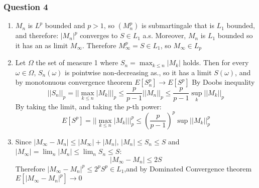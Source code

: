 \documentclass[12pt]{article}
\newcommand{\Q}[1]{\subsubsection*{Question #1}}
\begin{document}
\Q{4}
\begin{enumerate}
\item $M_n$ is $L^p$ bounded and $p > 1$, so $(M_n^p)$ is submartingale that is $L_1$ bounded, and therefore: $|M_n|^p$ converges to $S \in L_1$ a.s.
  Moreover, $M_n$ is $L_1$ bounded so it has an as limit
  $M_{\infty}$.
  Therefore $M_{\infty}^p = S \in L_1$,
  so $M_{\infty} \in L_p$

\item
  Let $\Omega$ the set of measure 1 where $S_n = \max_{k \le n} |M_k|$ holds. Then for every $\omega \in \Omega$,
  $S_n(\omega)$ is pointwise non-decreasing as., so it has a limit $S(\omega)$, and by monotonuous convergence theorem $E[S_n^p] \rightarrow E[S^p]$
  By Doobs inequality
  $$||S_n||_p = || \max_{k \le n} |M_k| ||_p \le \frac{p}{p-1}  ||M_n||_p \le \frac{p}{p-1} \sup_k ||M_k||_p$$
  By taking the limit, and taking the $p$-th power:
  $$E[S^p] = || \max_{k \le n} |M_k| ||_p^p \le \left(\frac{p}{p-1} \right)^p \sup||M_k||_p^p$$

\item
  Since $|M_{\infty} - M_n| \le  |M_{\infty}| + |M_n|$, $|M_n| \le S_n \le S$ and $|M_{\infty}| = \lim_n |M_n| \le \lim_n S_n \le S$:
  $$|M_{\infty} - M_n| \le  2 S$$
  Therefore $|M_{\infty} - M_n|^p \le  2^p S^p \in L_1$,and by Dominated Convergence theorem $E[|M_{\infty} - M_n|^p] \rightarrow 0$

\end{enumerate}
\end{document}
